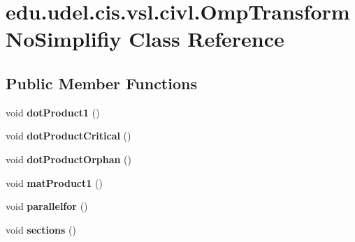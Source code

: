 \hypertarget{classedu_1_1udel_1_1cis_1_1vsl_1_1civl_1_1OmpTransformNoSimplifiy}{}\section{edu.\+udel.\+cis.\+vsl.\+civl.\+Omp\+Transform\+No\+Simplifiy Class Reference}
\label{classedu_1_1udel_1_1cis_1_1vsl_1_1civl_1_1OmpTransformNoSimplifiy}
\subsection*{Public Member Functions}
\begin{DoxyCompactItemize}
\item 
\hypertarget{classedu_1_1udel_1_1cis_1_1vsl_1_1civl_1_1OmpTransformNoSimplifiy_a251f3b4f30dcbfdab2ae42cc5cee4dc2}{}void {\bfseries dot\+Product1} ()\label{classedu_1_1udel_1_1cis_1_1vsl_1_1civl_1_1OmpTransformNoSimplifiy_a251f3b4f30dcbfdab2ae42cc5cee4dc2}

\item 
\hypertarget{classedu_1_1udel_1_1cis_1_1vsl_1_1civl_1_1OmpTransformNoSimplifiy_a30457a76c502703fc8b412fdcc4e1e47}{}void {\bfseries dot\+Product\+Critical} ()\label{classedu_1_1udel_1_1cis_1_1vsl_1_1civl_1_1OmpTransformNoSimplifiy_a30457a76c502703fc8b412fdcc4e1e47}

\item 
\hypertarget{classedu_1_1udel_1_1cis_1_1vsl_1_1civl_1_1OmpTransformNoSimplifiy_a084bdd506092ecff4a45a67f4a883a76}{}void {\bfseries dot\+Product\+Orphan} ()\label{classedu_1_1udel_1_1cis_1_1vsl_1_1civl_1_1OmpTransformNoSimplifiy_a084bdd506092ecff4a45a67f4a883a76}

\item 
\hypertarget{classedu_1_1udel_1_1cis_1_1vsl_1_1civl_1_1OmpTransformNoSimplifiy_a669522dc1e09a57e396e4729fa14bafb}{}void {\bfseries mat\+Product1} ()\label{classedu_1_1udel_1_1cis_1_1vsl_1_1civl_1_1OmpTransformNoSimplifiy_a669522dc1e09a57e396e4729fa14bafb}

\item 
\hypertarget{classedu_1_1udel_1_1cis_1_1vsl_1_1civl_1_1OmpTransformNoSimplifiy_a156b42aa6cd4182ccd55f7108d66c8bc}{}void {\bfseries parallelfor} ()\label{classedu_1_1udel_1_1cis_1_1vsl_1_1civl_1_1OmpTransformNoSimplifiy_a156b42aa6cd4182ccd55f7108d66c8bc}

\item 
\hypertarget{classedu_1_1udel_1_1cis_1_1vsl_1_1civl_1_1OmpTransformNoSimplifiy_a89a6b2a84341fd4bd937680bfa2acfbf}{}void {\bfseries sections} ()\label{classedu_1_1udel_1_1cis_1_1vsl_1_1civl_1_1OmpTransformNoSimplifiy_a89a6b2a84341fd4bd937680bfa2acfbf}


\end{DoxyCompactItemize}
